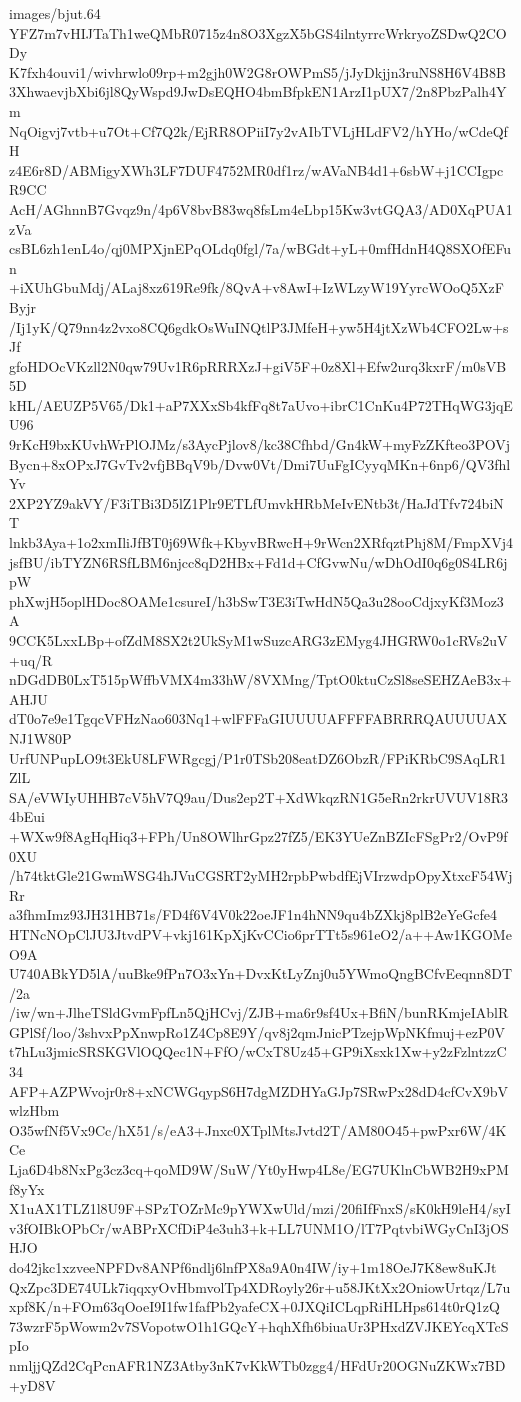 \begin{filecontents*}{images/bjut.64}
YFZ7m7vHIJTaTh1weQMbR0715z4n8O3XgzX5bGS4ilntyrrcWrkryoZSDwQ2CODy
K7fxh4ouvi1/wivhrwlo09rp+m2gjh0W2G8rOWPmS5/jJyDkjjn3ruNS8H6V4B8B
3XhwaevjbXbi6jl8QyWspd9JwDsEQHO4bmBfpkEN1ArzI1pUX7/2n8PbzPalh4Ym
NqOigvj7vtb+u7Ot+Cf7Q2k/EjRR8OPiiI7y2vAIbTVLjHLdFV2/hYHo/wCdeQfH
z4E6r8D/ABMigyXWh3LF7DUF4752MR0df1rz/wAVaNB4d1+6sbW+j1CCIgpcR9CC
AcH/AGhnnB7Gvqz9n/4p6V8bvB83wq8fsLm4eLbp15Kw3vtGQA3/AD0XqPUA1zVa
csBL6zh1enL4o/qj0MPXjnEPqOLdq0fgl/7a/wBGdt+yL+0mfHdnH4Q8SXOfEFun
+iXUhGbuMdj/ALaj8xz619Re9fk/8QvA+v8AwI+IzWLzyW19YyrcWOoQ5XzFByjr
/Ij1yK/Q79nn4z2vxo8CQ6gdkOsWuINQtlP3JMfeH+yw5H4jtXzWb4CFO2Lw+sJf
gfoHDOcVKzll2N0qw79Uv1R6pRRRXzJ+giV5F+0z8Xl+Efw2urq3kxrF/m0sVB5D
kHL/AEUZP5V65/Dk1+aP7XXxSb4kfFq8t7aUvo+ibrC1CnKu4P72THqWG3jqEU96
9rKcH9bxKUvhWrPlOJMz/s3AycPjlov8/kc38Cfhbd/Gn4kW+myFzZKfteo3POVj
Bycn+8xOPxJ7GvTv2vfjBBqV9b/Dvw0Vt/Dmi7UuFgICyyqMKn+6np6/QV3fhlYv
2XP2YZ9akVY/F3iTBi3D5lZ1Plr9ETLfUmvkHRbMeIvENtb3t/HaJdTfv724biNT
lnkb3Aya+1o2xmIliJfBT0j69Wfk+KbyvBRwcH+9rWcn2XRfqztPhj8M/FmpXVj4
jsfBU/ibTYZN6RSfLBM6njcc8qD2HBx+Fd1d+CfGvwNu/wDhOdI0q6g0S4LR6jpW
phXwjH5oplHDoc8OAMe1csureI/h3bSwT3E3iTwHdN5Qa3u28ooCdjxyKf3Moz3A
9CCK5LxxLBp+ofZdM8SX2t2UkSyM1wSuzcARG3zEMyg4JHGRW0o1cRVs2uV+uq/R
nDGdDB0LxT515pWffbVMX4m33hW/8VXMng/TptO0ktuCzSl8seSEHZAeB3x+AHJU
dT0o7e9e1TgqcVFHzNao603Nq1+wlFFFaGIUUUUAFFFFABRRRQAUUUUAXNJ1W80P
UrfUNPupLO9t3EkU8LFWRgcgj/P1r0TSb208eatDZ6ObzR/FPiKRbC9SAqLR1ZlL
SA/eVWIyUHHB7cV5hV7Q9au/Dus2ep2T+XdWkqzRN1G5eRn2rkrUVUV18R34bEui
+WXw9f8AgHqHiq3+FPh/Un8OWlhrGpz27fZ5/EK3YUeZnBZIcFSgPr2/OvP9f0XU
/h74tktGle21GwmWSG4hJVuCGSRT2yMH2rpbPwbdfEjVIrzwdpOpyXtxcF54WjRr
a3fhmImz93JH31HB71s/FD4f6V4V0k22oeJF1n4hNN9qu4bZXkj8plB2eYeGcfe4
HTNcNOpClJU3JtvdPV+vkj161KpXjKvCCio6prTTt5s961eO2/a++Aw1KGOMeO9A
U740ABkYD5lA/uuBke9fPn7O3xYn+DvxKtLyZnj0u5YWmoQngBCfvEeqnn8DT/2a
/iw/wn+JlheTSldGvmFpfLn5QjHCvj/ZJB+ma6r9sf4Ux+BfiN/bunRKmjeIAblR
GPlSf/loo/3shvxPpXnwpRo1Z4Cp8E9Y/qv8j2qmJnicPTzejpWpNKfmuj+ezP0V
t7hLu3jmicSRSKGVlOQQec1N+FfO/wCxT8Uz45+GP9iXsxk1Xw+y2zFzlntzzC34
AFP+AZPWvojr0r8+xNCWGqypS6H7dgMZDHYaGJp7SRwPx28dD4cfCvX9bVwlzHbm
O35wfNf5Vx9Cc/hX51/s/eA3+Jnxc0XTplMtsJvtd2T/AM80O45+pwPxr6W/4KCe
Lja6D4b8NxPg3cz3cq+qoMD9W/SuW/Yt0yHwp4L8e/EG7UKlnCbWB2H9xPMf8yYx
X1uAX1TLZ1l8U9F+SPzTOZrMc9pYWXwUld/mzi/20fiIfFnxS/sK0kH9leH4/syI
v3fOIBkOPbCr/wABPrXCfDiP4e3uh3+k+LL7UNM1O/lT7PqtvbiWGyCnI3jOSHJO
do42jkc1xzveeNPFDv8ANPf6ndlj6lnfPX8a9A0n4IW/iy+1m18OeJ7K8ew8uKJt
QxZpc3DE74ULk7iqqxyOvHbmvolTp4XDRoyly26r+u58JKtXx2OniowUrtqz/L7u
xpf8K/n+FOm63qOoeI9I1fw1fafPb2yafeCX+0JXQiICLqpRiHLHps614t0rQ1zQ
73wzrF5pWowm2v7SVopotwO1h1GQcY+hqhXfh6biuaUr3PHxdZVJKEYcqXTcSpIo
nmljjQZd2CqPcnAFR1NZ3Atby3nK7vKkWTb0zgg4/HFdUr20OGNuZKWx7BD+yD8V

\end{filecontents*}

